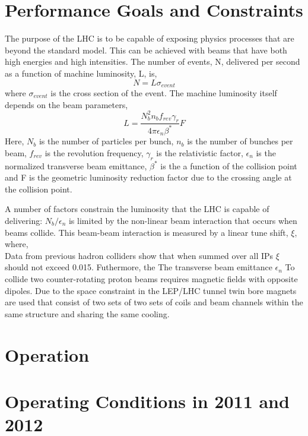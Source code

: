 \section{Performance Goals and Constraints}
The purpose of the LHC is to be
capable of exposing physics processes that are beyond the standard
model. This can be achieved with beams %
that have both high energies and high intensities.
The number of events, N, delivered per second as a function
of machine luminosity, L, is,
\begin{equation}
N=L\sigma_{event}
\end{equation}
where $\sigma_{event}$ is the cross section of the event.
The machine luminosity itself depends on the beam parameters,
\begin{equation}
L=\frac{N_{b}^{2}n_{b}f_{rev}\gamma_{r}}{4\pi \epsilon_{n}\beta^{*}}F
\end{equation}
Here, $N_{b}$ is the number of particles per bunch, $n_{b}$
is the number of bunches per beam, $f_{rev}$ is the
revolution frequency, $\gamma_{r}$ is the relativistic factor, 
$\epsilon_{n}$ is the normalized transverse beam
emittance, $\beta^{*}$ is the a function of the collision point
and F is the geometric luminosity reduction factor due to the crossing
angle at the collision point. 

A number of factors constrain the luminosity that the LHC is capable
of delivering: $N_{b}/\epsilon_{n}$ is limited by the%
non-linear beam interaction that occurs when beams collide. This
beam-beam interaction is measured by a linear tune shift, $\xi$, where,
\begin{equation}
\end{equation}
Data from previous hadron colliders show that when summed over
all IPs $\xi$ should not exceed 0.015. %
Futhermore, the 
The transverse beam emittance $\epsilon_{n}$
To collide two counter-rotating proton beams requires magnetic fields
with opposite dipoles. Due to the space constraint in the LEP/LHC
tunnel twin bore magnets are used that consist of two sets of 
two sets of coils and beam channels within the same structure and
sharing the same cooling. 

\section{Operation}

\section{Operating Conditions in 2011 and 2012}

